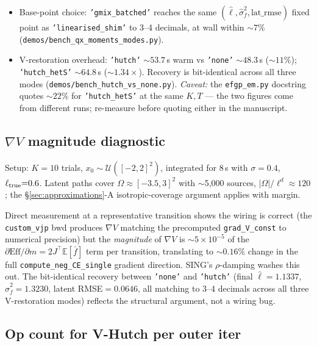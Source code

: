 \documentclass[11pt]{article}
\newcommand{\E}{\mathbb{E}}
\newcommand{\code}[1]{\texttt{\small #1}}
\begin{document}
\begin{itemize}
\setlength\itemsep{2pt}
\item Base-point choice: \code{'gmix\_batched'} reaches the same
  $(\hat\ell, \hat\sigma_f^2, \text{lat\_rmse})$ fixed point as
  \code{'linearised\_shim'} to 3--4 decimals, at wall within ${\sim}7\%$
  (\code{demos/bench\_qx\_moments\_modes.py}).
\item V-restoration overhead: \code{'hutch'} ${\sim}53.7$\,s warm vs
  \code{'none'} ${\sim}48.3$\,s (${\sim}11\%$);
  \code{'hutch\_hetS'} ${\sim}64.8$\,s (${\sim}1.34{\times}$).
  Recovery is bit-identical across all three modes
  (\code{demos/bench\_hutch\_vs\_none.py}). \emph{Caveat:} the
  \code{efgp\_em.py} docstring quotes ${\sim}22\%$ for
  \code{'hutch\_hetS'} at the same $K,T$ --- the two figures come from
  different runs; re-measure before quoting either in the manuscript.
\end{itemize}

\subsection{$\nabla V$ magnitude diagnostic}

Setup: $K{=}10$ trials, $x_0\sim\mathcal{U}([-2,2]^2)$, integrated for
$8$\,s with $\sigma{=}0.4$, $\ell_{\rm true}{=}0.6$. Latent paths cover
$\Omega\approx[-3.5, 3]^2$ with $\sim$5{,}000 sources,
$|\Omega|/\ell^d \approx 120$; the §\ref{sec:approximations}-A
isotropic-coverage argument applies with margin.

Direct measurement at a representative transition shows the wiring is
correct (the \code{custom\_vjp} bwd produces $\nabla V$ matching the
precomputed \code{grad\_V\_const} to numerical precision) but the
\emph{magnitude} of $\nabla V$ is ${\sim}5\times 10^{-5}$ of the
$\partial \mathrm{Eff}/\partial m = 2 J^\top \E[\bar f]$ term per
transition, translating to ${\sim}0.16\%$ change in the full
\code{compute\_neg\_CE\_single} gradient direction. SING's $\rho$-damping
washes this out. The bit-identical recovery between \code{'none'} and
\code{'hutch'} (final $\hat\ell{=}1.1337$, $\hat\sigma_f^2{=}1.3230$,
latent RMSE${=}0.0646$, all matching to 3--4 decimals across all three
V-restoration modes) reflects the structural argument, not a wiring bug.

\subsection{Op count for V-Hutch per outer iter}
\end{document}
